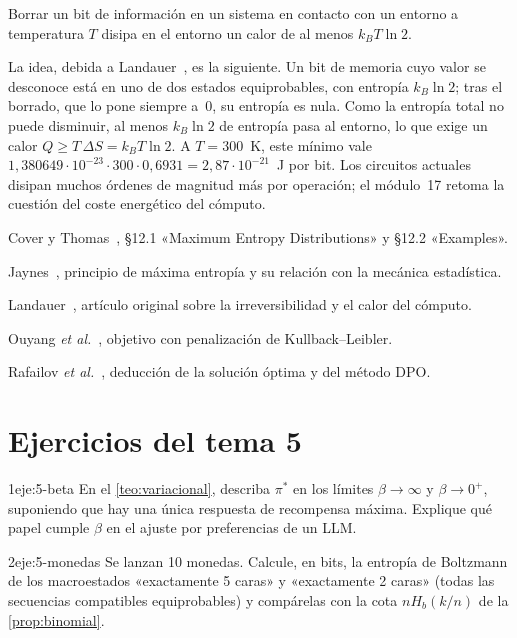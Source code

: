 \begin{proposicion}\label{prop:landauer}
Borrar un bit de información en un sistema en contacto con un entorno a temperatura $T$ disipa en el entorno un calor de al menos $k_BT\ln 2$.
\end{proposicion}

La idea, debida a Landauer~\cite{landauer}, es la siguiente. Un bit de memoria cuyo valor se desconoce está en uno de dos estados equiprobables, con entropía $k_B\ln 2$; tras el borrado, que lo pone siempre a~0, su entropía es nula. Como la entropía total no puede disminuir, al menos $k_B\ln 2$ de entropía pasa al entorno, lo que exige un calor $Q\ge T\,\Delta S=k_BT\ln 2$. A $T=300$~K, este mínimo vale $1{,}380649\cdot10^{-23}\cdot300\cdot0{,}6931=2{,}87\cdot10^{-21}$~J por bit. Los circuitos actuales disipan muchos órdenes de magnitud más por operación; el módulo~17 retoma la cuestión del coste energético del cómputo.

\begin{lecturas}
\item Cover y Thomas~\cite{ct}, §12.1 «Maximum Entropy Distributions» y §12.2 «Examples».
\item Jaynes~\cite{jaynes}, principio de máxima entropía y su relación con la mecánica estadística.
\item Landauer~\cite{landauer}, artículo original sobre la irreversibilidad y el calor del cómputo.
\item Ouyang \emph{et al.}~\cite{instructgpt}, objetivo con penalización de Kullback--Leibler.
\item Rafailov \emph{et al.}~\cite{dpo}, deducción de la solución óptima y del método DPO.
\end{lecturas}

\section*{Ejercicios del tema 5}

\begin{ejercicio}{1}{eje:5-beta}
En el \cref{teo:variacional}, describa $\pi^{*}$ en los límites $\beta\to\infty$ y $\beta\to 0^{+}$, suponiendo que hay una única respuesta de recompensa máxima. Explique qué papel cumple $\beta$ en el ajuste por preferencias de un LLM.
\end{ejercicio}

\begin{ejercicio}{2}{eje:5-monedas}
Se lanzan 10 monedas. Calcule, en bits, la entropía de Boltzmann de los macroestados «exactamente 5 caras» y «exactamente 2 caras» (todas las secuencias compatibles equiprobables) y compárelas con la cota $nH_b(k/n)$ de la \cref{prop:binomial}.
\end{ejercicio}

